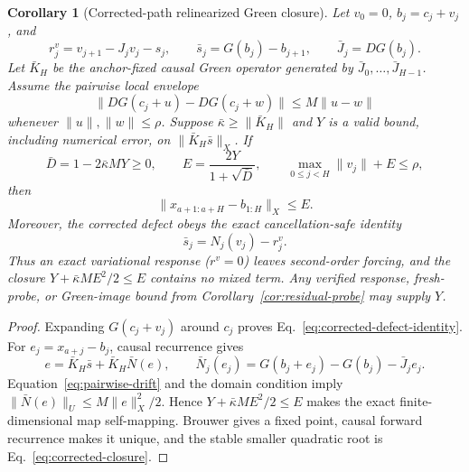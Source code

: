 \documentclass{article}
\newtheorem{corollary}{Corollary}
\begin{document}
\begin{corollary}[Corrected-path relinearized Green closure]
\label{cor:relinearized-green}
Let $v_0=0$, $b_j=c_j+v_j$, and
\begin{equation}
 r^v_j=v_{j+1}-J_jv_j-s_j,\qquad
 \bar s_j=G(b_j)-b_{j+1},\qquad \bar J_j=DG(b_j).
 \label{eq:corrected-defect}
\end{equation}
Let $\bar K_H$ be the anchor-fixed causal Green operator generated by
$\bar J_0,\ldots,\bar J_{H-1}$.  Assume the pairwise local envelope
\begin{equation}
 \|DG(c_j+u)-DG(c_j+w)\|\le M\|u-w\|
 \label{eq:pairwise-drift}
\end{equation}
whenever $\|u\|,\|w\|\le\rho$.  Suppose
$\bar\kappa\ge\|\bar K_H\|$ and $Y$ is a valid bound, including numerical
error, on $\|\bar K_H\bar s\|_X$.  If
\begin{equation}
 \bar D=1-2\bar\kappa MY\ge0,\qquad
 E=\frac{2Y}{1+\sqrt{\bar D}},\qquad
 \max_{0\le j<H}\|v_j\|+E\le\rho,
 \label{eq:corrected-closure}
\end{equation}
then
\begin{equation}
 \|x_{a+1:a+H}-b_{1:H}\|_X\le E.
 \label{eq:corrected-tube}
\end{equation}
Moreover, the corrected defect obeys the exact cancellation-safe identity
\begin{equation}
 \boxed{\bar s_j=N_j(v_j)-r^v_j.}
 \label{eq:corrected-defect-identity}
\end{equation}
Thus an exact variational response ($r^v=0$) leaves second-order forcing, and
the closure $Y+\bar\kappa ME^2/2\le E$ contains no mixed term.  Any verified
response, fresh-probe, or Green-image bound from
Corollary~\ref{cor:residual-probe} may supply $Y$.
\end{corollary}

\begin{proof}
Expanding $G(c_j+v_j)$ around $c_j$ proves
Eq.~\eqref{eq:corrected-defect-identity}.  For
$e_j=x_{a+j}-b_j$, causal recurrence gives
\begin{equation}
 e=\bar K_H\bar s+\bar K_H\bar N(e),\qquad
 \bar N_j(e_j)=G(b_j+e_j)-G(b_j)-\bar J_je_j.
\end{equation}
Equation~\eqref{eq:pairwise-drift} and the domain condition imply
$\|\bar N(e)\|_U\le M\|e\|_X^2/2$.  Hence
$Y+\bar\kappa ME^2/2\le E$ makes the exact finite-dimensional map self-mapping.
Brouwer gives a fixed point, causal forward recurrence makes it unique, and the
stable smaller quadratic root is Eq.~\eqref{eq:corrected-closure}.
\end{proof}
\end{document}
